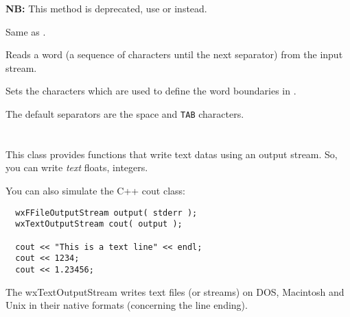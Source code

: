 {\bf NB:} This method is deprecated, use  
or  instead.

Same as .


\label{wxtextinputstreamreadword}


Reads a word (a sequence of characters until the next separator) from the
input stream.




\label{wxtextinputstreamsetstringseparators}


Sets the characters which are used to define the word boundaries in 
.

The default separators are the space and {\tt TAB} characters.


\section{}\label{wxtextoutputstream}

This class provides functions that write text datas using an output stream.
So, you can write {\it text} floats, integers.

You can also simulate the C++ cout class:

\begin{verbatim}
  wxFFileOutputStream output( stderr );
  wxTextOutputStream cout( output );

  cout << "This is a text line" << endl;
  cout << 1234;
  cout << 1.23456;
\end{verbatim}

The wxTextOutputStream writes text files (or streams) on DOS, Macintosh
and Unix in their native formats (concerning the line ending).


